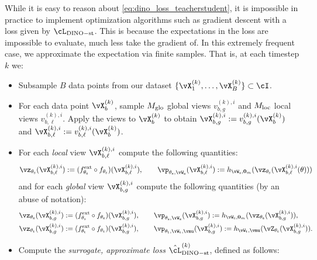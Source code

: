 \documentclass[../../book-main.tex]{subfiles}
\begin{document}
While it is easy to reason about \eqref{eq:dino_loss_teacherstudent}, it is impossible in practice to implement optimization algorithms such as gradient descent with a loss given by \(\cL_{\dino{}-\student\teacher}\). This is because the expectations in the loss are impossible to evaluate, much less take the gradient of. In this extremely frequent case, we approximate the expectation via finite samples. That is, at each timestep \(k\) we:
\begin{itemize}
    \item Subsample \(B\) data points from our dataset \(\{\vX_{1}^{(k)}, \dots, \vX_{B}^{(k)}\} \subset \cI\).
    \item For each data point \(\vX_{b}^{(k)}\), sample \(M_{\mathrm{glo}}\) global views \(v_{b, g}^{(k), i}\) and \(M_{\mathrm{loc}}\) local views \(v_{b, \ell}^{(k), i}\). Apply the views to \(\vX_{b}^{(k)}\) to obtain \(\vX_{b, g}^{(k), i} := v_{b, g}^{(k), i}(\vX_{b}^{(k)})\) and \(\vX_{b, \ell}^{(k), i} := v_{b, \ell}^{(k), i}(\vX_{b}^{(k)})\).
    \item For each \textit{local} view \(\vX_{b, \ell}^{(k), i}\) compute the following quantities:
    \begin{equation}
        \vz_{\theta_{\student}}(\vX_{b, \ell}^{(k), i}) := (f_{\theta_{\student}}^{\ext} \circ f_{\theta_{\student}})(\vX_{b, \ell}^{(k), i}), \qquad \vp_{\theta_{\student}, \vW_{\student}}(\vX_{b, \ell}^{(k), i}) := h_{\vW_{\student}, \vzero_{m}}(\vz_{\theta_{\student}}(\vX_{b, \ell}^{(k), i}(\theta)))
    \end{equation}
    and for each \textit{global} view \(\vX_{b, g}^{(k), i}\) compute the following quantities (by an abuse of notation):
    \begin{align}
        &\vz_{\theta_{\student}}(\vX_{b, g}^{(k), i}) := (f_{\theta_{\student}}^{\ext} \circ f_{\theta_{\student}})(\vX_{b, g}^{(k), i}), \qquad \vp_{\theta_{\student}, \vW_{\student}}(\vX_{b, g}^{(k), i}) := h_{\vW_{\student}, \vzero_{m}}(\vz_{\theta_{\student}}(\vX_{b, g}^{(k), i})), \\
        &\vz_{\theta_{\teacher}}(\vX_{b, g}^{(k), i}) := (f_{\theta_{\teacher}}^{\ext} \circ f_{\theta_{\teacher}})(\vX_{b, g}^{(k), i}), \qquad \vp_{\theta_{\teacher}, \vW_{\teacher}, \vmu}(\vX_{b, g}^{(k), i}) := h_{\vW_{\teacher}, \vmu}(\vZ_{\theta_{\teacher}}(\vX_{b, g}^{(k), i})).
    \end{align}
    \item Compute the \textit{surrogate, approximate loss} \(\hat{\cL}_{\dino-\student\teacher}^{(k)}\), defined as follows: 

\end{itemize}
\end{document}
